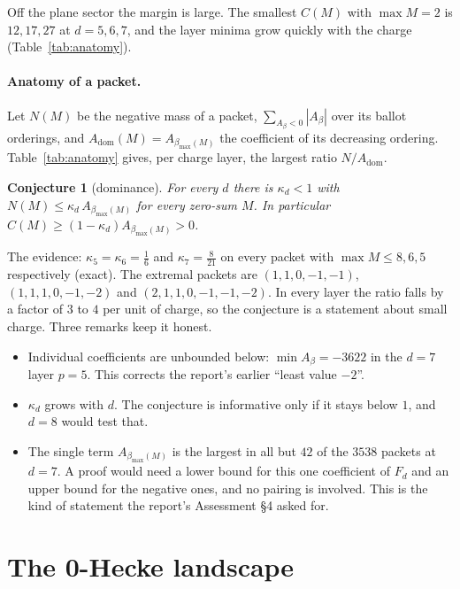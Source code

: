 \documentclass[11pt,a4paper]{article}
\theoremstyle{plain}
\newtheorem{conjecture}[theorem]{Conjecture}
\theoremstyle{definition}
\theoremstyle{remark}
\begin{document}
Off the plane sector the margin is large. The smallest $C(M)$ with $\max M = 2$ is $12, 17, 27$ at
$d = 5, 6, 7$, and the layer minima grow quickly with the charge (Table~\ref{tab:anatomy}).

\paragraph{Anatomy of a packet.} Let $N(M)$ be the negative mass of a packet, $\sum_{A_\beta < 0}
|A_\beta|$ over its ballot orderings, and $A_{\mathrm{dom}}(M) = A_{\beta_{\max}(M)}$ the coefficient
of its decreasing ordering. Table~\ref{tab:anatomy} gives, per charge layer, the largest ratio
$N/A_{\mathrm{dom}}$.



\begin{conjecture}[dominance]\label{conj:dom}
For every $d$ there is $\kappa_d < 1$ with $N(M) \le \kappa_d\, A_{\beta_{\max}(M)}$ for every
zero-sum $M$. In particular $C(M) \ge (1 - \kappa_d) A_{\beta_{\max}(M)} > 0$.
\end{conjecture}

The evidence: $\kappa_5 = \kappa_6 = \frac16$ and $\kappa_7 = \frac{8}{21}$ on every packet with
$\max M \le 8, 6, 5$ respectively (exact). The extremal packets are $(1,1,0,-1,-1)$,
$(1,1,1,0,-1,-2)$ and $(2,1,1,0,-1,-1,-2)$. In every layer the ratio falls by a factor of $3$ to
$4$ per unit of charge, so the conjecture is a statement about small charge. Three remarks keep
it honest.
\begin{itemize}[nosep]
\item Individual coefficients are unbounded below: $\min A_\beta = -3622$ in the $d = 7$ layer
  $p = 5$. This corrects the report's earlier ``least value $-2$''.
\item $\kappa_d$ grows with $d$. The conjecture is informative only if it stays below $1$, and
  $d = 8$ would test that.
\item The single term $A_{\beta_{\max}(M)}$ is the largest in all but $42$ of the $3538$ packets at
  $d = 7$. A proof would need a lower bound for this one coefficient of $F_d$ and an upper bound
  for the negative ones, and no pairing is involved. This is the kind of statement the report's
  Assessment \S4 asked for.
\end{itemize}

\section{The 0-Hecke landscape}\label{sec:hecke}
\end{document}
